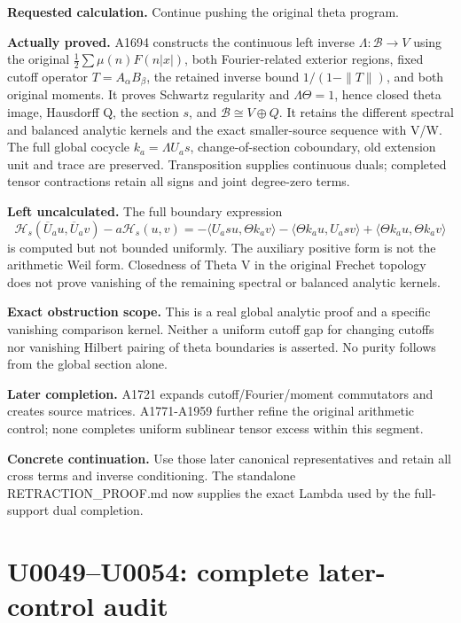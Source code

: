 \textbf{Requested calculation.} Continue pushing the original theta
program.

\textbf{Actually proved.} A1694 constructs the continuous left inverse
\(\Lambda:\mathscr B\to V\) using the original
\(\frac12\sum\mu(n)F(n|x|)\), both Fourier-related exterior regions,
fixed cutoff operator \(T=A_\alpha B_\beta\), the retained inverse bound
\(1/(1-\|T\|)\), and both original moments. It proves Schwartz
regularity and \(\Lambda\Theta=1\), hence closed theta image, Hausdorff
Q, the section \(s\), and \(\mathscr B\cong V\oplus Q\). It retains the
different spectral and balanced analytic kernels and the exact
smaller-source sequence with V/W. The full global cocycle
\(k_a=\Lambda U_as\), change-of-section coboundary, old extension unit
and trace are preserved. Transposition supplies continuous duals;
completed tensor contractions retain all signs and joint degree-zero
terms.

\textbf{Left uncalculated.} The full boundary expression \[
\mathcal H_s(\overline U_au,\overline U_av)-a\mathcal H_s(u,v)
=-\langle U_asu,\Theta k_av\rangle-\langle\Theta k_au,U_asv\rangle
+\langle\Theta k_au,\Theta k_av\rangle
\] is computed but not bounded uniformly. The auxiliary positive form is
not the arithmetic Weil form. Closedness of Theta V in the original
Frechet topology does not prove vanishing of the remaining spectral or
balanced analytic kernels.

\textbf{Exact obstruction scope.} This is a real global analytic proof
and a specific vanishing comparison kernel. Neither a uniform cutoff gap
for changing cutoffs nor vanishing Hilbert pairing of theta boundaries
is asserted. No purity follows from the global section alone.

\textbf{Later completion.} A1721 expands cutoff/Fourier/moment
commutators and creates source matrices. A1771-A1959 further refine the
original arithmetic control; none completes uniform sublinear tensor
excess within this segment.

\textbf{Concrete continuation.} Use those later canonical
representatives and retain all cross terms and inverse conditioning. The
standalone RETRACTION\_PROOF.md now supplies the exact Lambda used by
the full-support dual completion.

\section{U0049--U0054: complete later-control
audit}\label{u0049u0054-complete-later-control-audit}

